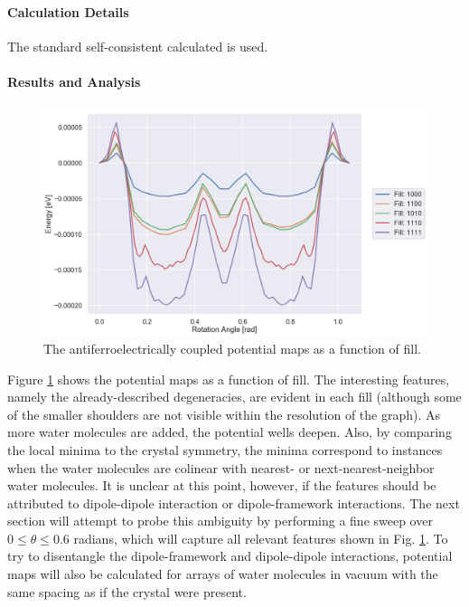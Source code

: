         \paragraph{Calculation Details} The standard self-consistent calculated is used.
        
        \paragraph{Results and Analysis}
        
        \begin{figure}
            \centering
            \includegraphics[width=0.9\linewidth]{Figures/System/pmap_af_broad.png}
            \caption{The antiferroelectrically coupled potential maps as a function of fill.}
            \label{fig:pmap_af_broad}
        \end{figure}
        
        Figure \ref{fig:pmap_af_broad} shows the potential maps as a function of fill. The interesting features, namely the already-described degeneracies, are evident in each fill (although some of the smaller shoulders are not visible within the resolution of the graph). As more water molecules are added, the potential wells deepen. Also, by comparing the local minima to the crystal symmetry, the minima correspond to instances when the water molecules are colinear with nearest- or next-nearest-neighbor water molecules. It is unclear at this point, however, if the features should be attributed to dipole-dipole interaction or dipole-framework interactions. The next section will attempt to probe this ambiguity by performing a fine sweep over $0\le \theta \le 0.6$ radians, which will capture all relevant features shown in Fig. \ref{fig:pmap_af_broad}. To try to disentangle the dipole-framework and dipole-dipole interactions, potential maps will also be calculated for arrays of water molecules in vacuum with the same spacing as if the crystal were present.
        

